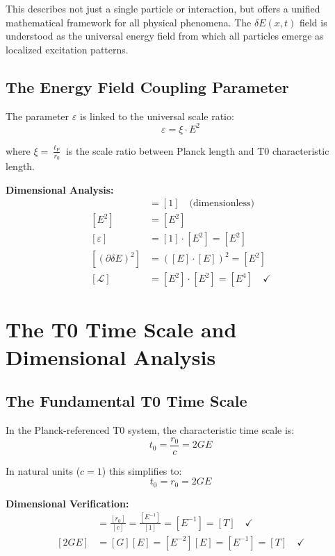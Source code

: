 \documentclass[12pt,a4paper]{report}
\newcommand{\lP}{\ell_{\text{P}}}         %
\newcommand{\rzero}{r_0}                  %
\newcommand{\tzero}{t_0}                  %
\begin{document}
	This describes not just a single particle or interaction, but offers a unified mathematical framework for all physical phenomena. The $\delta E(x,t)$ field is understood as the universal energy field from which all particles emerge as localized excitation patterns.
	
	\subsection{The Energy Field Coupling Parameter}
	
	The parameter $\varepsilon$ is linked to the universal scale ratio:
	\begin{equation}
		\varepsilon = \xi \cdot E^2
		\label{eq:energy_coupling}
	\end{equation}
	
	where $\xi = \frac{\lP}{\rzero}$ is the scale ratio between Planck length and T0 characteristic length.
	
	\textbf{Dimensional Analysis:}
	\begin{align}
		[\xi] &= [1] \quad \text{(dimensionless)} \\
		[E^2] &= [E^2] \\
		[\varepsilon] &= [1] \cdot [E^2] = [E^2] \\
		[(\partial\delta E)^2] &= ([E] \cdot [E])^2 = [E^2] \\
		[\mathcal{L}] &= [E^2] \cdot [E^2] = [E^4] \quad \checkmark
	\end{align}
	
	\section{The T0 Time Scale and Dimensional Analysis}
	
	\subsection{The Fundamental T0 Time Scale}
	
	In the Planck-referenced T0 system, the characteristic time scale is:
	\begin{equation}
		\boxed{\tzero = \frac{\rzero}{c} = 2GE}
		\label{eq:t0_time}
	\end{equation}
	
	In natural units ($c = 1$) this simplifies to:
	\begin{equation}
		\tzero = \rzero = 2GE
	\end{equation}
	
	\textbf{Dimensional Verification:}
	\begin{align}
		[\tzero] &= \frac{[\rzero]}{[c]} = \frac{[E^{-1}]}{[1]} = [E^{-1}] = [T] \quad \checkmark \\
		[2GE] &= [G][E] = [E^{-2}][E] = [E^{-1}] = [T] \quad \checkmark
	\end{align}
	
\end{document}
